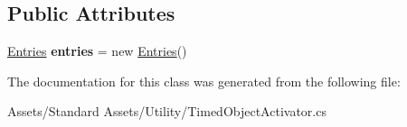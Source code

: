 \subsection*{Public Attributes}
\begin{DoxyCompactItemize}
\item 
\hyperlink{class_unity_standard_assets_1_1_utility_1_1_timed_object_activator_1_1_entries}{Entries} {\bfseries entries} = new \hyperlink{class_unity_standard_assets_1_1_utility_1_1_timed_object_activator_1_1_entries}{Entries}()\hypertarget{class_unity_standard_assets_1_1_utility_1_1_timed_object_activator_a9a83bb800381f78d7701ebb24cc58b7a}{}\label{class_unity_standard_assets_1_1_utility_1_1_timed_object_activator_a9a83bb800381f78d7701ebb24cc58b7a}

\end{DoxyCompactItemize}


The documentation for this class was generated from the following file\+:\begin{DoxyCompactItemize}
\item 
Assets/\+Standard Assets/\+Utility/Timed\+Object\+Activator.\+cs\end{DoxyCompactItemize}
